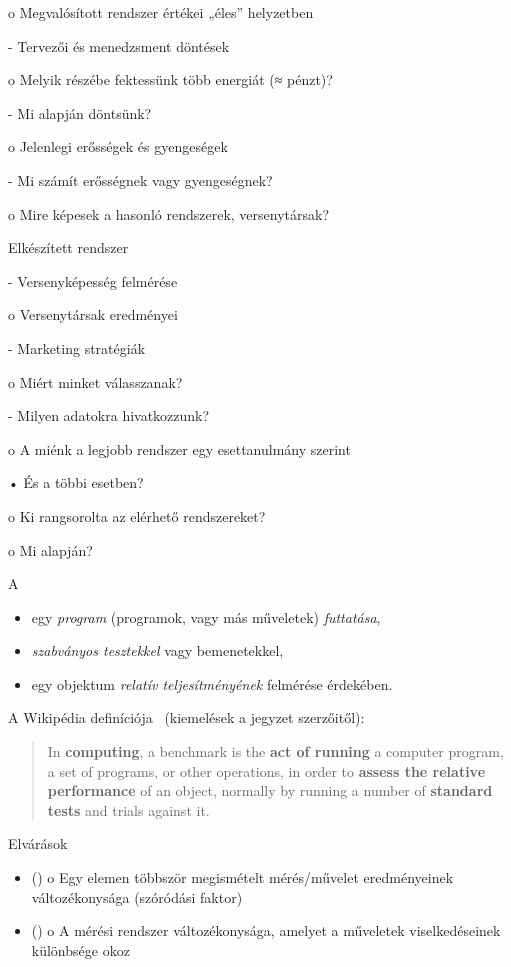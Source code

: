 o Megvalósított rendszer értékei „éles” helyzetben

- Tervezői és menedzsment döntések

o Melyik részébe fektessünk több energiát (≈ pénzt)? 

- Mi alapján döntsünk?

o Jelenlegi erősségek és gyengeségek

- Mi számít erősségnek vagy gyengeségnek?

o Mire képesek a hasonló rendszerek, versenytársak?

Elkészített rendszer

- Versenyképesség felmérése

o Versenytársak eredményei

- Marketing stratégiák

o Miért minket válasszanak?

- Milyen adatokra hivatkozzunk?

o A miénk a legjobb rendszer egy esettanulmány szerint

• És a többi esetben?

o Ki rangsorolta az elérhető rendszereket?

o Mi alapján?

\begin{definicio}
	A 
	\begin{itemize}
		\item egy \emph{program} (programok, vagy más műveletek) \emph{futtatása},
		\item \emph{szabványos tesztekkel} vagy bemenetekkel,
		\item egy objektum \emph{relatív teljesítményének} felmérése érdekében.
	\end{itemize}
\end{definicio}

A Wikipédia definíciója~\cite{wiki:benchmark} (kiemelések a jegyzet szerzőitől):

\begin{quote}
	In \textbf{computing}, a benchmark is the \textbf{act of running} a computer program, a set of programs, or other operations, in order to \textbf{assess the relative performance} of an object, normally by running a number of \textbf{standard tests} and trials against it.
\end{quote}

Elvárások

\begin{itemize}
	\item {} ()
	o Egy elemen többször megismételt mérés/művelet eredményeinek változékonysága (szóródási faktor)
	\item {} ()
	o A mérési rendszer változékonysága, amelyet a műveletek viselkedéseinek különbsége okoz
\end{itemize}

